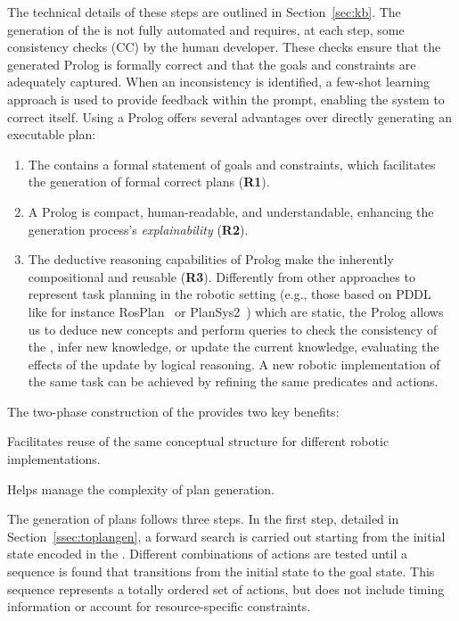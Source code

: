 The technical details of these steps are outlined in
Section~\ref{sec:kb}. The generation of the \kb is not fully
automated and requires, at each step, some consistency checks (CC) by
the human developer. These checks ensure that the generated Prolog is
formally correct and that the goals and constraints are adequately
captured. When an inconsistency is identified, a few-shot learning
approach is used to provide feedback within the prompt, enabling the
system to correct itself.
Using a Prolog \kb offers several advantages over directly generating an executable plan:
\begin{enumerate}[nosep]
  \item The \kb contains a formal statement of goals and constraints, which facilitates the generation of formal correct plans (\textbf{R1}).
  \item A Prolog \kb is compact, human-readable, and understandable, enhancing the generation process's \emph{explainability} (\textbf{R2}).
  \item The deductive reasoning capabilities of Prolog make the \kb inherently compositional and reusable (\textbf{R3}).
  Differently from other approaches to represent task planning in the robotic setting (e.g., those based on PDDL~\cite{pddl31} like for instance RosPlan~\cite{DBLP:conf/aips/CashmoreFLMRCPH15} or PlanSys2~\cite{DBLP:conf/iros/0001CMR21}) which are static, the Prolog \kb allows us to deduce new concepts and perform queries to check the consistency of the \kb, infer new knowledge, or update the current knowledge, evaluating the effects of the \kb update by logical reasoning. A new robotic implementation of the same task can be achieved by refining the same predicates and actions.
\end{enumerate}

\noindent The two-phase construction of the \kb provides two key benefits:
\begin{enumerate*}
    \item Facilitates reuse of the same \HL conceptual structure for different robotic implementations. 
    \item Helps manage the complexity of plan generation.
\end{enumerate*}


The generation of plans follows three steps. In the first step, detailed in
Section~\ref{ssec:toplangen}, a forward search is carried out starting
from the initial state encoded in the \kb. Different combinations of
actions are tested until a sequence is found that transitions from the
initial state to the goal state. This sequence represents a totally
ordered set of actions, but does not include timing information or
account for resource-specific constraints.

